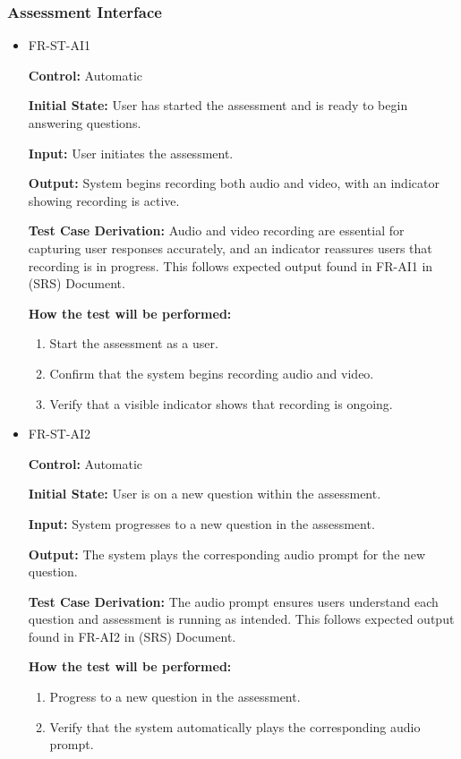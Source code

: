 \documentclass[12pt, titlepage]{article}
\begin{document}
\subsubsection{Assessment Interface}

\begin{itemize}
  \item FR-ST-AI1
    \begin{mdframed}[linewidth=0.5mm]
      \textbf{Control:} Automatic \par
      \textbf{Initial State:} User has started the assessment and is ready to begin answering questions. \par
      \textbf{Input:} User initiates the assessment. \par
      \textbf{Output:} System begins recording both audio and video, with an indicator showing recording is active. \par
      \textbf{Test Case Derivation:} Audio and video recording are essential for capturing user responses accurately,
       and an indicator reassures users that recording is in progress. This follows expected output found in FR-AI1 in (SRS) Document. \par
      \textbf{How the test will be performed:}
      \begin{enumerate}[noitemsep]
        \item Start the assessment as a user.
        \item Confirm that the system begins recording audio and video.
        \item Verify that a visible indicator shows that recording is ongoing.
      \end{enumerate}
    \end{mdframed}

  \item FR-ST-AI2
    \begin{mdframed}[linewidth=0.5mm]
      \textbf{Control:} Automatic \par
      \textbf{Initial State:} User is on a new question within the assessment. \par
      \textbf{Input:} System progresses to a new question in the assessment. \par
      \textbf{Output:} The system plays the corresponding audio prompt for the new question. \par
      \textbf{Test Case Derivation:} The audio prompt ensures users understand each question and assessment is running as intended.
      This follows expected output found in FR-AI2 in (SRS) Document. \par
      \textbf{How the test will be performed:}
      \begin{enumerate}[noitemsep]
        \item Progress to a new question in the assessment.
        \item Verify that the system automatically plays the corresponding audio prompt.
      \end{enumerate}
    \end{mdframed}


\end{itemize}
\end{document}
